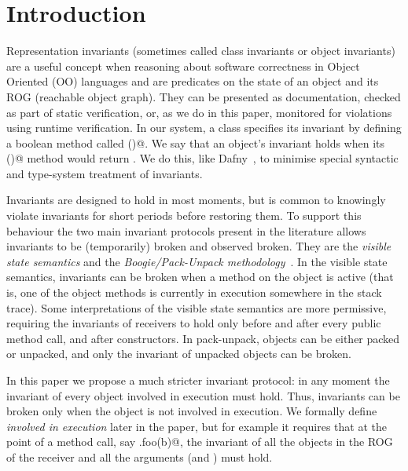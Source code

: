 \section{Introduction}
\label{s:intro}
Representation invariants (sometimes called class invariants or object invariants) are
a useful concept when reasoning about software correctness in Object Oriented (OO) languages and are predicates on the state of an object and its ROG (reachable object graph).
They can be presented as documentation, checked as part of static verification, or, as we do in this paper, monitored for violations using runtime verification.
In our system, a class specifies its invariant by defining a boolean method called \Q@invariant()@.
We say that an object's invariant holds when its \Q@invariant()@ method would return \Q@true@. 
We do this, like Dafny~\cite{DBLP:conf/sigada/Leino12}, to minimise special syntactic and type-system treatment of invariants.%

Invariants are designed to hold in most moments, but 
is common to knowingly violate invariants for short periods before restoring them.
To support this behaviour the two main invariant protocols present in the literature allows invariants to be (temporarily) broken and observed broken.
They are the \emph{visible state semantics} \cite{Meyer:1988:OSC:534929} and the \emph{Boogie/Pack-Unpack methodology}~\cite{DBLP:journals/jot/BarnettDFLS04}.
In the visible state semantics, invariants can be broken when a method on the object is active (that is, one of the object methods is currently in execution somewhere in the stack trace).
Some interpretations of the visible state semantics are more permissive, requiring the invariants of receivers to hold only before and after every public method call, and after constructors. 
In pack-unpack, objects can be either packed or unpacked, and only the invariant of unpacked objects can be broken.

In this paper we propose a much stricter invariant protocol: in any moment the invariant of every object involved in execution must hold.
Thus, invariants can be broken only when the object is not involved in execution. We formally define \emph{involved in execution} later in the paper, but for example it requires that at the point of a method call, say \Q@a.foo(b)@, the invariant of all the objects in the ROG of the receiver and all the arguments (\Q@a@ and \Q@b@) must hold.

